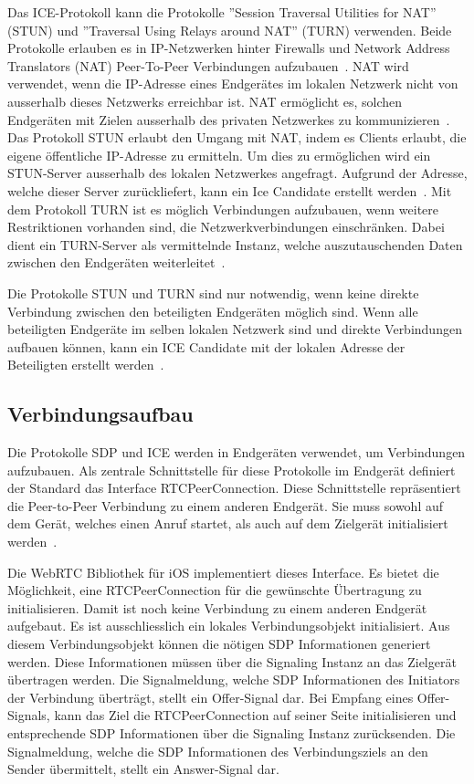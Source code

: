 Das ICE-Protokoll kann die Protokolle ''Session Traversal Utilities for NAT'' (STUN) und ''Traversal Using Relays around NAT'' (TURN) verwenden.
Beide Protokolle erlauben es in IP-Netzwerken hinter Firewalls und Network Address Translators (NAT) Peer-To-Peer Verbindungen aufzubauen~\cite{rfc_8445_ice}.
NAT wird verwendet, wenn die IP-Adresse eines Endgerätes im lokalen Netzwerk nicht von ausserhalb dieses Netzwerks erreichbar ist.
NAT ermöglicht es, solchen Endgeräten mit Zielen ausserhalb des privaten Netzwerkes zu kommunizieren~\cite{rfc_2663_nat}.
Das Protokoll STUN erlaubt den Umgang mit NAT, indem es Clients erlaubt, die eigene öffentliche IP-Adresse zu ermitteln.
Um dies zu ermöglichen wird ein STUN-Server ausserhalb des lokalen Netzwerkes angefragt.
Aufgrund der Adresse, welche dieser Server zurückliefert, kann ein Ice Candidate erstellt werden~\cite{rfc_8445_ice}.
Mit dem Protokoll TURN ist es möglich Verbindungen aufzubauen, wenn weitere Restriktionen vorhanden sind, die Netzwerkverbindungen einschränken.
Dabei dient ein TURN-Server als vermittelnde Instanz, welche auszutauschenden Daten zwischen den Endgeräten weiterleitet~\cite{webRTC_TURN}.

Die Protokolle STUN und TURN sind nur notwendig, wenn keine direkte Verbindung zwischen den beteiligten Endgeräten möglich sind.
Wenn alle beteiligten Endgeräte im selben lokalen Netzwerk sind und direkte Verbindungen aufbauen können, kann ein ICE Candidate mit der lokalen Adresse der Beteiligten erstellt werden~\cite{webRTC_TURN}.

\subsection{Verbindungsaufbau}

Die Protokolle SDP und ICE werden in Endgeräten verwendet, um Verbindungen aufzubauen.
Als zentrale Schnittstelle für diese Protokolle im Endgerät definiert der Standard das Interface RTCPeerConnection.
Diese Schnittstelle repräsentiert die Peer-to-Peer Verbindung zu einem anderen Endgerät.
Sie muss sowohl auf dem Gerät, welches einen Anruf startet, als auch auf dem Zielgerät initialisiert werden~\cite{webrtc_spec}.

Die WebRTC Bibliothek für iOS implementiert dieses Interface.
Es bietet die Möglichkeit, eine RTCPeerConnection für die gewünschte Übertragung zu initialisieren.
Damit ist noch keine Verbindung zu einem anderen Endgerät aufgebaut.
Es ist ausschliesslich ein lokales Verbindungsobjekt initialisiert.
Aus diesem Verbindungsobjekt können die nötigen SDP Informationen generiert werden.
Diese Informationen müssen über die Signaling Instanz an das Zielgerät übertragen werden.
Die Signalmeldung, welche SDP Informationen des Initiators der Verbindung überträgt, stellt ein Offer-Signal dar.
Bei Empfang eines Offer-Signals, kann das Ziel die RTCPeerConnection auf seiner Seite initialisieren und entsprechende SDP Informationen über die Signaling Instanz zurücksenden.
Die Signalmeldung, welche die SDP Informationen des Verbindungsziels an den Sender übermittelt, stellt ein Answer-Signal dar.

